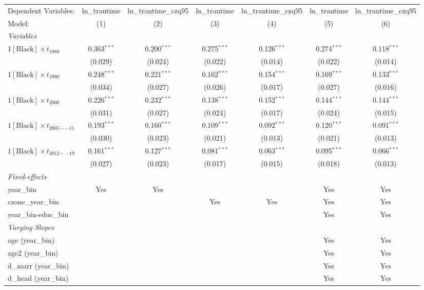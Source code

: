 \begin{tabular}{lcccccc}
\tabularnewline\midrule\midrule
Dependent Variables:&ln\_trantime&ln\_trantime\_czq95&ln\_trantime&ln\_trantime\_czq95&ln\_trantime&ln\_trantime\_czq95\\
Model:&(1) & (2) & (3) & (4) & (5) & (6)\\
\midrule \emph{Variables}&   &   &   &   &   &  \\
$1[\text{Black}] \times t_{1980}$ & 0.363$^{***}$ & 0.200$^{***}$ & 0.275$^{***}$ & 0.126$^{***}$ & 0.274$^{***}$ & 0.118$^{***}$\\
  &(0.029) & (0.024) & (0.022) & (0.014) & (0.022) & (0.014)\\
$1[\text{Black}] \times t_{1990}$ & 0.248$^{***}$ & 0.221$^{***}$ & 0.162$^{***}$ & 0.154$^{***}$ & 0.169$^{***}$ & 0.133$^{***}$\\
  &(0.034) & (0.027) & (0.026) & (0.017) & (0.027) & (0.016)\\
$1[\text{Black}] \times t_{2000}$ & 0.226$^{***}$ & 0.232$^{***}$ & 0.138$^{***}$ & 0.152$^{***}$ & 0.144$^{***}$ & 0.144$^{***}$\\
  &(0.031) & (0.027) & (0.024) & (0.017) & (0.024) & (0.015)\\
$1[\text{Black}] \times t_{2005--11}$ & 0.193$^{***}$ & 0.160$^{***}$ & 0.109$^{***}$ & 0.092$^{***}$ & 0.120$^{***}$ & 0.091$^{***}$\\
  &(0.030) & (0.023) & (0.021) & (0.013) & (0.021) & (0.013)\\
$1[\text{Black}] \times t_{2012--19}$ & 0.161$^{***}$ & 0.127$^{***}$ & 0.081$^{***}$ & 0.063$^{***}$ & 0.095$^{***}$ & 0.066$^{***}$\\
  &(0.027) & (0.023) & (0.017) & (0.015) & (0.018) & (0.013)\\
\midrule \emph{Fixed-effects}&   &   &   &   &   &  \\
year\_bin & Yes & Yes &  &  & Yes & Yes\\
czone\_year\_bin &  &  & Yes & Yes & Yes & Yes\\
year\_bin-educ\_bin &  &  &  &  & Yes & Yes\\
\midrule \emph{Varying Slopes}&   &   &   &   &   &  \\
age (year\_bin) &  &  &  &  & Yes & Yes\\
age2 (year\_bin) &  &  &  &  & Yes & Yes\\
d\_marr (year\_bin) &  &  &  &  & Yes & Yes\\
d\_head (year\_bin) &  &  &  &  & Yes & Yes\\

\end{tabular}
